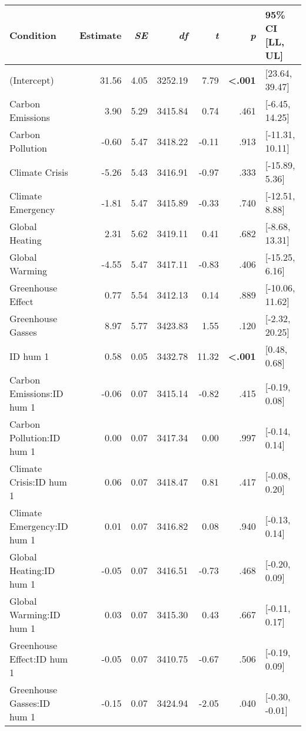 \begin{table}[ht]
\centering
\begin{tabular}{lrrrrrl}
  \hline
Condition & Estimate & \textit{SE} & \textit{df} & \textit{t} & \textit{p} & 95\% CI [LL, UL] \\ 
  \hline
(Intercept) & 31.56 & 4.05 & 3252.19 & 7.79 & \textbf{\textless  .001} & [23.64, 39.47] \\ 
  Carbon Emissions & 3.90 & 5.29 & 3415.84 & 0.74 & .461 & [-6.45, 14.25] \\ 
  Carbon Pollution & -0.60 & 5.47 & 3418.22 & -0.11 & .913 & [-11.31, 10.11] \\ 
  Climate Crisis & -5.26 & 5.43 & 3416.91 & -0.97 & .333 & [-15.89, 5.36] \\ 
  Climate Emergency & -1.81 & 5.47 & 3415.89 & -0.33 & .740 & [-12.51, 8.88] \\ 
  Global Heating & 2.31 & 5.62 & 3419.11 & 0.41 & .682 & [-8.68, 13.31] \\ 
  Global Warming & -4.55 & 5.47 & 3417.11 & -0.83 & .406 & [-15.25, 6.16] \\ 
  Greenhouse Effect & 0.77 & 5.54 & 3412.13 & 0.14 & .889 & [-10.06, 11.62] \\ 
  Greenhouse Gasses & 8.97 & 5.77 & 3423.83 & 1.55 & .120 & [-2.32, 20.25] \\ 
  ID hum 1 & 0.58 & 0.05 & 3432.78 & 11.32 & \textbf{\textless  .001} & [0.48, 0.68] \\ 
  Carbon Emissions:ID hum 1 & -0.06 & 0.07 & 3415.14 & -0.82 & .415 & [-0.19, 0.08] \\ 
  Carbon Pollution:ID hum 1 & 0.00 & 0.07 & 3417.34 & 0.00 & .997 & [-0.14, 0.14] \\ 
  Climate Crisis:ID hum 1 & 0.06 & 0.07 & 3418.47 & 0.81 & .417 & [-0.08, 0.20] \\ 
  Climate Emergency:ID hum 1 & 0.01 & 0.07 & 3416.82 & 0.08 & .940 & [-0.13, 0.14] \\ 
  Global Heating:ID hum 1 & -0.05 & 0.07 & 3416.51 & -0.73 & .468 & [-0.20, 0.09] \\ 
  Global Warming:ID hum 1 & 0.03 & 0.07 & 3415.30 & 0.43 & .667 & [-0.11, 0.17] \\ 
  Greenhouse Effect:ID hum 1 & -0.05 & 0.07 & 3410.75 & -0.67 & .506 & [-0.19, 0.09] \\ 
  Greenhouse Gasses:ID hum 1 & -0.15 & 0.07 & 3424.94 & -2.05 & .040 & [-0.30, -0.01] \\ 
   \hline
\end{tabular}
\end{table}
